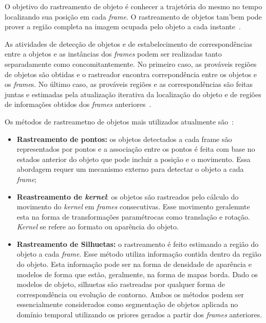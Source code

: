 	O objetivo do rastreamento de objeto é conhecer a trajetória do mesmo no tempo localizando sua posição em cada \textit{frame}. O rastreamento de objetos tam'bem pode prover a região completa na imagem ocupada pelo objeto a cada instante~\cite{yilmaz}. 

	As atividades de detecção de objetos e de estabelecimento de correspondências entre a objetos e as instâncias dos \textit{frames} podem ser realizadas tanto separadamente como concomitantemente. No primeiro caso, as prováveis regiões de objetos são obtidas e o rastreador encontra correpondência entre os objetos e os \textit{frame}s. No último caso, as prováveis regiões e as correspondências são feitas juntas e estimadas pela atualização iterativa da localização do objeto e de regiões de informações obtidos dos \textit{frames} anteriores~\cite{yilmaz}.

	Os métodos de rastreametno de objetos mais utilizados atualmente são~\cite{yilmaz}:

	\begin{itemize}
		\item \textbf{Rastreamento de pontos:} os objetos detectados a cada frame são representados por pontos e a associação entre os pontos é feita com base no estados anterior do objeto que pode incluir a posição e o movimento. Essa abordagem requer um mecanismo externo para detectar o objeto a cada \textit{frame};

		\item \textbf{Reastreamento de \textit{kernel}}: os objetos são rastreados pelo cálculo do movimento do \textit{kernel} em \textit{frames} consecutivas. Esse movimento geralemnte esta na forma de transformações paramétrocas como translação e rotação. \textit{Kernel} se refere ao formato ou aparência do objeto.

		\item \textbf{Rastreamento de Silhuetas:} o rastreamento é feito estimando a região do objeto a cada \textit{frame}. Esse método utiliza informação contida dentro da região do objeto. Esta informação pode ser na forma de densidade de aparência e modelos de forma que estão, geralmente, na forma de mapas borda. Dado os modelos de objeto, silhuetas são rastreadas por qualquer forma de correspondência ou evolução de contorno. Ambos os métodos podem ser essencialmente considerados como segmentação de objetos aplicada no domínio temporal utilizando os priores gerados a partir dos \textit{frames} anteriores.
	\end{itemize}




